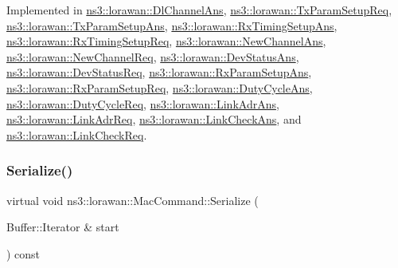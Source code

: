 Implemented in \hyperlink{classns3_1_1lorawan_1_1DlChannelAns_a1dbe96549927ce3aa98c8d68a341f5bd}{ns3\+::lorawan\+::\+Dl\+Channel\+Ans}, \hyperlink{classns3_1_1lorawan_1_1TxParamSetupReq_ab4032edd01d5ba3139d3a5896918bf19}{ns3\+::lorawan\+::\+Tx\+Param\+Setup\+Req}, \hyperlink{classns3_1_1lorawan_1_1TxParamSetupAns_ac25e03a1ce6ce0d52ba94f56bac8c208}{ns3\+::lorawan\+::\+Tx\+Param\+Setup\+Ans}, \hyperlink{classns3_1_1lorawan_1_1RxTimingSetupAns_a477b8b609277cd43f5cd85696e8aae06}{ns3\+::lorawan\+::\+Rx\+Timing\+Setup\+Ans}, \hyperlink{classns3_1_1lorawan_1_1RxTimingSetupReq_a8fa4e7482550477e2a5a2193e8429b69}{ns3\+::lorawan\+::\+Rx\+Timing\+Setup\+Req}, \hyperlink{classns3_1_1lorawan_1_1NewChannelAns_ad0528161cddbea57fc0b509b3b76c9b7}{ns3\+::lorawan\+::\+New\+Channel\+Ans}, \hyperlink{classns3_1_1lorawan_1_1NewChannelReq_af60960cdfafc846b66a657a25678f90e}{ns3\+::lorawan\+::\+New\+Channel\+Req}, \hyperlink{classns3_1_1lorawan_1_1DevStatusAns_a167cca1cb129a2084dcc5412a00b3126}{ns3\+::lorawan\+::\+Dev\+Status\+Ans}, \hyperlink{classns3_1_1lorawan_1_1DevStatusReq_ad550f7d8f599f48d54dea36d87ab4ab9}{ns3\+::lorawan\+::\+Dev\+Status\+Req}, \hyperlink{classns3_1_1lorawan_1_1RxParamSetupAns_a1972e0a8577118a86e15545e93d4460e}{ns3\+::lorawan\+::\+Rx\+Param\+Setup\+Ans}, \hyperlink{classns3_1_1lorawan_1_1RxParamSetupReq_a92e0695decb4f9d8ba29bcb83168c386}{ns3\+::lorawan\+::\+Rx\+Param\+Setup\+Req}, \hyperlink{classns3_1_1lorawan_1_1DutyCycleAns_a201b7cdda81f6b775f13da09ba675e26}{ns3\+::lorawan\+::\+Duty\+Cycle\+Ans}, \hyperlink{classns3_1_1lorawan_1_1DutyCycleReq_a8d0d86de5e54eab057bcdd9b79c97aa9}{ns3\+::lorawan\+::\+Duty\+Cycle\+Req}, \hyperlink{classns3_1_1lorawan_1_1LinkAdrAns_a91434c73f73c48f60c1fa2226278ca99}{ns3\+::lorawan\+::\+Link\+Adr\+Ans}, \hyperlink{classns3_1_1lorawan_1_1LinkAdrReq_aa6f8732a740ae000006f56fd605cfaf4}{ns3\+::lorawan\+::\+Link\+Adr\+Req}, \hyperlink{classns3_1_1lorawan_1_1LinkCheckAns_a35637426df92297b70b3a7a1beae3326}{ns3\+::lorawan\+::\+Link\+Check\+Ans}, and \hyperlink{classns3_1_1lorawan_1_1LinkCheckReq_aa3a4fd54a54699ca3ec15ce608008fc3}{ns3\+::lorawan\+::\+Link\+Check\+Req}.

\mbox{\label{classns3_1_1lorawan_1_1MacCommand_a0ed44b33942ddc3dc9694dc06ab0b87f}} 
\subsubsection{\texorpdfstring{Serialize()}{Serialize()}}
{\footnotesize\ttfamily virtual void ns3\+::lorawan\+::\+Mac\+Command\+::\+Serialize (\begin{DoxyParamCaption}\item[{Buffer\+::\+Iterator \&}]{start }\end{DoxyParamCaption}) const\hspace{0.3cm}{\ttfamily [pure virtual]}}

